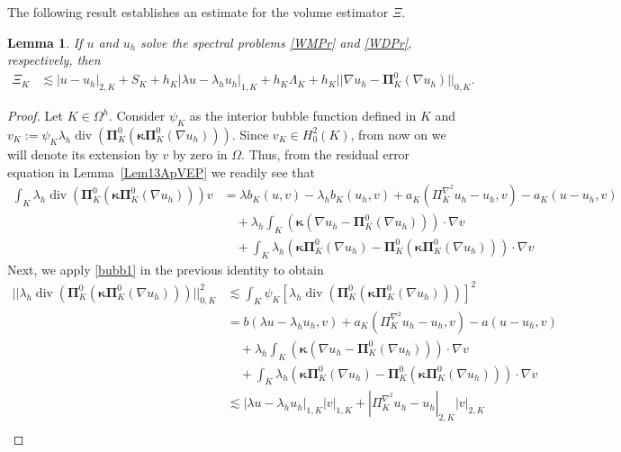 \documentclass[final,reqno]{elsarticle}
\newtheorem{lemma}{Lemma}[section]
\newcommand\vdiv{\mathop{\mathrm{div}}\nolimits}
\def\bkappa{\boldsymbol{\kappa}}
\def\bPi{\mathbf{\Pi}}
\begin{document}
The following result establishes an estimate for the volume estimator $\Xi$.
\begin{lemma}\label{ApVEPLem18}
    If  $u$ and $u_h$ solve the spectral problems \eqref{WMPr} and \eqref{WDPr}, respectively,  then 
\begin{align}    
\Xi_K&\lesssim  |u-u_h|_{2,K} + S_K + h_K|\lambda u-\lambda_h u_h|_{1,K} + h_K\Lambda_K + h_K ||\nabla u_h - \bPi_K^0 (\nabla u_h)||_{0,K}.\nonumber
\end{align}
\end{lemma}
\begin{proof}
Let $K\in\Omega^h$. Consider $\psi_K$ as the interior bubble function defined in $K$ and  $v_K:=\psi_K\lambda_h\vdiv\left( \bPi_K^0 (\bkappa \bPi_K^0(\nabla u_h))\right)$. Since $v_K\in H_0^2(K)$, from now on we will denote its extension by $v$ by zero in $\Omega$. Thus, from the residual error equation in Lemma~\eqref{Lem13ApVEP} we readily see that
    \begin{align*} 
       \int_{K}\lambda_h \vdiv\left( \bPi_K^0 (\bkappa \bPi_K^0(\nabla u_h))\right) v  &= \lambda b_K(u,v)-\lambda_h b_K( u_h,v) + a_K(\Pi_K^{\nabla^2} u_h-u_h,v) -a_K(u-u_h,v)\\
        &\quad+ \lambda_h  \int_K (\bkappa(\nabla u_h - \bPi_K^0 (\nabla u_h)))\cdot \nabla v  \nonumber\\
        &\quad   + \int_K \lambda_h \left(\bkappa \bPi_K^0(\nabla u_h)-\bPi_K^0(\bkappa \bPi_K^0(\nabla u_h))\right) \cdot \nabla v
    \end{align*}
Next, we apply \eqref{bubb1} in the previous identity to obtain 
    \begin{align}
    ||\lambda_h \vdiv\left( \bPi_K^0 (\bkappa \bPi_K^0(\nabla u_h))\right) ||_{0,K}^2  &\lesssim \int_K \psi_K [\lambda_h \vdiv\left( \bPi_K^0 (\bkappa \bPi_K^0(\nabla u_h))\right)]^2 \nonumber \\ %
        &   = b(\lambda u- \lambda_h u_h,v) +  a_K(\Pi_K^{\nabla^2} u_h-u_h,v)-a(u-u_h,v) \nonumber\\
        &\quad + \lambda_h  \int_K (\bkappa(\nabla u_h - \bPi_K^0 (\nabla u_h)))\cdot \nabla v   \nonumber\\
        &\quad + \int_K \lambda_h \left(\bkappa \bPi_K^0(\nabla u_h)-\bPi_K^0(\bkappa \bPi_K^0(\nabla u_h))\right) \cdot \nabla v\nonumber\\
       & \lesssim |\lambda u-\lambda_h u_h|_{1,K}|v|_{1,K} + |\Pi_K^{\nabla^2} u_h-u_h|_{2,K} |v|_{2,K} \nonumber\\ 

\end{align}
\end{proof}
\end{document}
